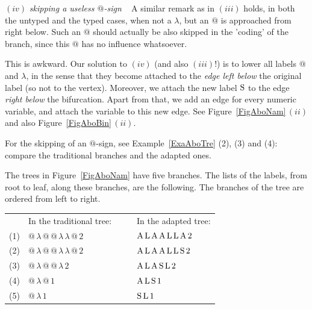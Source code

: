 \documentclass[submission,copyright,creativecommons]{eptcs}
\begin{document}
$(iv)$ {\em skipping a useless $@$-sign\/} ~ A similar remark as in $(iii)$ holds, in both the untyped and the typed cases, when not a $\lambda$, but an $@$ is approached from right below. Such an $@$ should actually be also skipped in the 'coding' of the branch, since this $@$ has no influence whatsoever.

This is awkward. Our solution to $(iv)$ (and also $(iii)$!) is to lower all labels $@$ and $\lambda$, in the sense that they become attached to the {\em edge left below\/} the original label (so not to the vertex). Moreover, we attach the new label ${\rm S}$ to the edge {\em right below\/} the bifurcation. Apart from that, we add an edge for every numeric variable, and attach the variable to this new edge.
See Figure~\ref{FigAboNam}\,$(ii)$ and also Figure~\ref{FigAboBin}\,$(ii)$.


For the skipping of an $@$-sign, see Example~\ref{ExaAboTre} (2), (3) and (4): compare the traditional branches and the adapted ones.

\begin{Exa}\label{ExaAboTre}
The trees in Figure~\ref{FigAboNam} have five branches. The lists of the labels, from root to leaf, along these branches, are the following. The branches of the tree are ordered from left to right.

\medskip

\begin{tabular}{ll|l}

 & \rule[-0.7em]{0em}{0.7em}In the traditional tree:~~ & ~~In the adapted tree: \\




(1) & $ @ \, \lambda \, @ \, @ \, \lambda \, \lambda \, @ \, 2 $
 & ~~$ {\rm A} \, {\rm L} \, {\rm A} \, {\rm A} \, {\rm L} \, {\rm L} \, {\rm A} \, 2 $ \\

(2) & $ @ \, \lambda \, @ \, @ \, \lambda \, \lambda \, @ \, 2 $
 & ~~$ {\rm A} \, {\rm L} \, {\rm A} \, {\rm A} \, {\rm L} \, {\rm L} \, {\rm S} \, 2 $ \\

(3) & $ @ \, \lambda \, @ \, @ \, \lambda \, 2 $
 & ~~$ {\rm A} \, {\rm L} \, {\rm A} \, {\rm S} \, {\rm L} \, 2 $ \\

(4) & $ @ \, \lambda \, @ \, 1 $
 & ~~$ {\rm A} \, {\rm L} \, {\rm S} \, 1 $ \\

(5) & $ @ \, \lambda \, 1 $
 & ~~$ {\rm S} \, {\rm L} \, 1 $
 \end{tabular}
\end{Exa}
\end{document}
